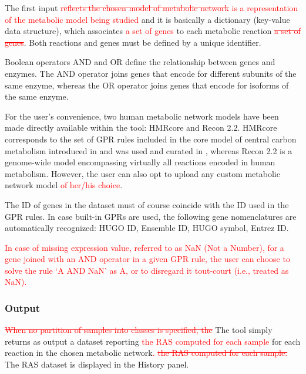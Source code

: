 \documentclass[preprint,12pt,authoryear]{elsarticle}
\newcommand{\red}{\textcolor{red}}
\begin{document}
The first input \red{\sout{reflects the chosen model of metabolic
    network} is a representation of the metabolic model being studied}
and it is basically a dictionary (key-value data structure), which
associates \red{a set of genes} to each metabolic reaction
\red{\sout{a set of genes}}. Both reactions and genes must be defined
by a unique identifier.

Boolean operators AND and OR define the relationship between genes and
enzymes.
%
The AND operator joins genes that encode for different subunits of the
same enzyme, whereas the OR operator joins genes that encode for
isoforms of the same enzyme.

For the user's convenience, two human metabolic network models have
been made directly available within the tool: \textsf{HMRcore} and
\textsf{Recon} 2.2. \textsf{HMRcore} corresponds to the set of GPR
rules included in the core model of central carbon metabolism
introduced in \citep{DiFilippo2016} and was used and curated in
\citep{popFBA,graudenzi2018fbaca,damiani2018integration,marea},
whereas \textsf{Recon} 2.2 \citep{swainston2016recon} is a genome-wide
model encompassing virtually all reactions encoded in human
metabolism.
%
However, the user can also opt to upload any custom metabolic network
model \red{of her/his choice}.

The ID of genes in the dataset must of course coincide with the ID
used in the GPR rules. In case built-in GPRs are used, the following
gene nomenclatures are automatically recognized: HUGO ID, Ensemble ID,
HUGO symbol, Entrez ID.

\red{In case of missing expression value, referred to as NaN (Not a
  Number), for a gene joined with an AND operator in a given GPR rule,
  the user can choose to solve the rule `A AND NaN' as A, or to
  disregard it tout-court (i.e., treated as NaN).}


\subsubsection{Output}

\red{\sout{When no partition of samples into classes is specified,
    the}} The tool simply returns as output a dataset reporting
\red{the RAS computed for each sample} for each reaction in the chosen
metabolic network\red{. \sout{the RAS computed for each sample.}} The
RAS dataset is displayed in the History panel.
\end{document}
